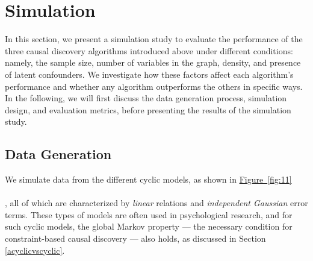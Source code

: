 \documentclass[twoside, 11pt]{article}
\newcommand*{\figref}[2][]{%
  \hyperref[{fig:#2}]{%
    Figure~\ref*{fig:#2}%
    \ifx\\#1\\%
    \else
      #1%
    \fi
  }%
}
\begin{document}

\section{Simulation} \label{simulation}

 In this section, we present a simulation study to evaluate the performance of the three causal discovery algorithms introduced above under different conditions: namely, the sample size, number of variables in the graph, density, and presence of latent confounders. We investigate how these factors affect each algorithm's performance and whether any algorithm outperforms the others in specific ways. In the following, we will first discuss the data generation process, simulation design, and evaluation metrics, before presenting the results of the simulation study.

\subsection{Data Generation}
We simulate data from the different cyclic models, as shown in \figref[]{11}, all of which are characterized by \textit{linear} relations and \textit{independent Gaussian} error terms. These types of models are often used in psychological research, and for such cyclic models, the global Markov property --- the necessary condition for constraint-based causal discovery --- also holds, as discussed in Section \ref{acyclicvscyclic}.
\end{document}
